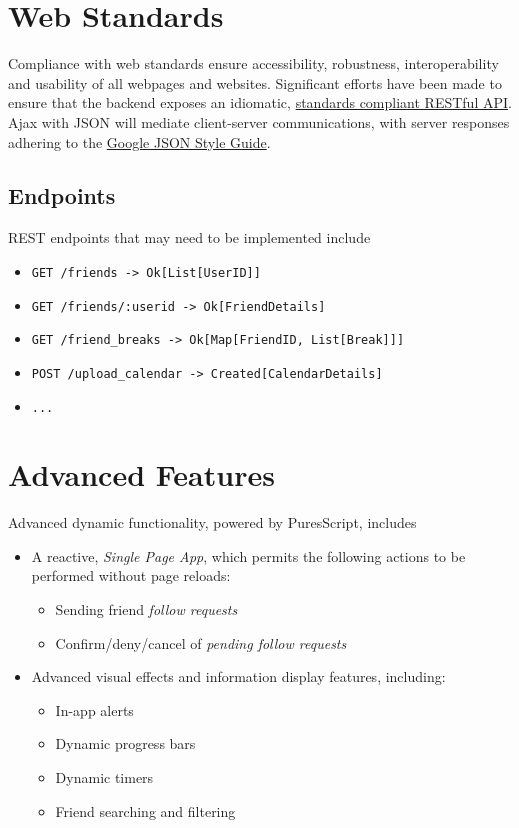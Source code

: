 \documentclass[11pt,a4paper]{report}
\begin{document}
\section{Web Standards}

Compliance with web standards ensure accessibility, robustness, interoperability and usability of all webpages and websites. Significant efforts have been made to ensure that the backend exposes an idiomatic, \href{https://http2.github.io/}{standards compliant RESTful API}. Ajax with JSON will mediate client-server communications, with server responses adhering to the \href{https://google.github.io/styleguide/jsoncstyleguide.xml}{Google JSON Style Guide}.

\subsection{Endpoints}

REST endpoints that may need to be implemented include

\begin{itemize}
    \item \texttt{GET /friends -> Ok[List[UserID]]}
    \item \texttt{GET /friends/:userid -> Ok[FriendDetails]}
    \item \texttt{GET /friend\_breaks -> Ok[Map[FriendID, List[Break]]]}
    \item \texttt{POST /upload\_calendar -> Created[CalendarDetails]}
    \item \texttt{...}
\end{itemize}

\section{Advanced Features}

Advanced dynamic functionality, powered by PuresScript, includes

\begin{itemize}
    \item A reactive, \textit{Single Page App}, which permits the following actions to be performed without page reloads:
        \begin{itemize}
            \item Sending friend \textit{follow requests}
            \item Confirm/deny/cancel of \textit{pending follow requests}
        \end{itemize}
    \item Advanced visual effects and information display features, including:
        \begin{itemize}
            \item In-app alerts
            \item Dynamic progress bars
            \item Dynamic timers
            \item Friend searching and filtering
        \end{itemize}
\end{itemize}
\end{document}
